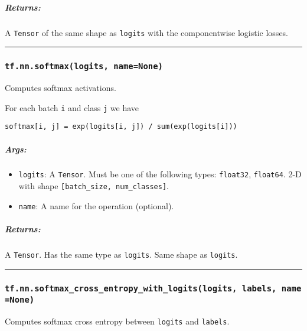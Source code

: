 \subparagraph{Returns: }\label{returns-17}

A \texttt{Tensor} of the same shape as \texttt{logits} with the
componentwise logistic losses.

\begin{center}\rule{0.5\linewidth}{\linethickness}\end{center}

\subsubsection{\texorpdfstring{\texttt{tf.nn.softmax(logits,\ name=None)}
}{tf.nn.softmax(logits, name=None) }}\label{tf.nn.softmaxlogits-namenone}

Computes softmax activations.

For each batch \texttt{i} and class \texttt{j} we have

\begin{verbatim}
softmax[i, j] = exp(logits[i, j]) / sum(exp(logits[i]))
\end{verbatim}

\subparagraph{Args: }\label{args-18}

\begin{itemize}
\tightlist
\item
  \texttt{logits}: A \texttt{Tensor}. Must be one of the following
  types: \texttt{float32}, \texttt{float64}. 2-D with shape
  \texttt{{[}batch\_size,\ num\_classes{]}}.
\item
  \texttt{name}: A name for the operation (optional).
\end{itemize}

\subparagraph{Returns: }\label{returns-18}

A \texttt{Tensor}. Has the same type as \texttt{logits}. Same shape as
\texttt{logits}.

\begin{center}\rule{0.5\linewidth}{\linethickness}\end{center}

\subsubsection{\texorpdfstring{\texttt{tf.nn.softmax\_cross\_entropy\_with\_logits(logits,\ labels,\ name=None)}
}{tf.nn.softmax\_cross\_entropy\_with\_logits(logits, labels, name=None) }}\label{tf.nn.softmaxux5fcrossux5fentropyux5fwithux5flogitslogits-labels-namenone}

Computes softmax cross entropy between \texttt{logits} and
\texttt{labels}.

